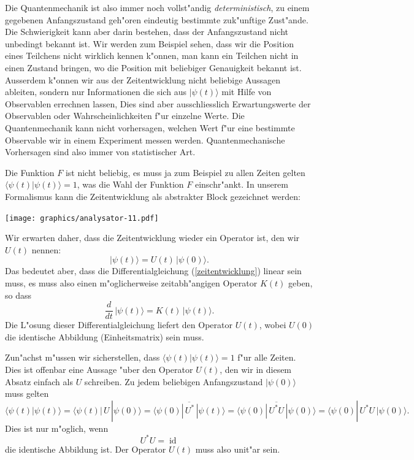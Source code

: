 Die Quantenmechanik ist also immer noch vollst"andig {\em deterministisch},
zu einem gegebenen Anfangszustand geh"oren eindeutig bestimmte
zuk"unftige Zust"ande.
Die Schwierigkeit kann aber darin bestehen, dass der Anfangszustand nicht
unbedingt bekannt ist.
Wir werden zum Beispiel sehen, dass wir die Position eines Teilchens
nicht wirklich kennen k"onnen, man kann ein Teilchen nicht in
einen Zustand bringen, wo die Position mit beliebiger Genauigkeit
bekannt ist.
Ausserdem k"onnen wir aus der Zeitentwicklung nicht beliebige Aussagen
ableiten, sondern nur Informationen die sich aus $|\psi(t)\rangle$ 
mit Hilfe von Observablen errechnen lassen,
Dies sind aber ausschliesslich Erwartungswerte der Observablen oder
Wahrscheinlichkeiten f"ur einzelne Werte.
Die Quantenmechanik kann nicht vorhersagen, welchen Wert f"ur eine
bestimmte Observable wir in einem Experiment messen werden.
Quantenmechanische Vorhersagen sind also immer von statistischer Art.


Die Funktion $F$ ist nicht beliebig, es muss ja zum Beispiel zu allen Zeiten
gelten
$\langle\psi(t)|\psi(t)\rangle=1$, was die Wahl der Funktion $F$ einschr"ankt.
In unserem Formalismus kann die Zeitentwicklung als abstrakter Block
gezeichnet werden:
\begin{center}
\texttt{[image: graphics/analysator-11.pdf]}
\end{center}
Wir erwarten daher, dass die Zeitentwicklung wieder ein Operator ist,
den wir $U(t)$ nennen:
\[
|\psi(t)\rangle = U(t)\,|\psi(0)\rangle.
\]
Das bedeutet aber, dass die Differentialgleichung (\ref{zeitentwicklung})
linear sein muss, es muss also einen m"oglicherweise zeitabh"angigen
Operator $K(t)$ geben, so dass 
\begin{equation}
\frac{d}{dt}\,|\psi(t)\rangle = K(t)\,|\psi(t)\rangle.
\label{zeitentwicklung-linear}
\end{equation}
Die L"osung dieser Differentialgleichung liefert den Operator $U(t)$,
wobei $U(0)$ die identische Abbildung (Einheitsmatrix) sein muss.

Zun"achst m"ussen wir sicherstellen, dass $\langle\psi(t)|\psi(t)\rangle=1$
f"ur alle Zeiten. Dies ist offenbar eine Aussage "uber den Operator $U(t)$,
den wir in diesem Absatz einfach als $U$ schreiben.
Zu jedem beliebigen Anfangszustand $|\psi(0)\rangle$ muss gelten
\[
\langle \psi(t)|\psi(t)\rangle
=
\langle \psi(t)|\,U\,|\psi(0)\rangle
=
\overline{\langle\psi(0)|\,U^*\,|\psi(t)\rangle}
=
\overline{\langle\psi(0)|\,U^*U\,|\psi(0)\rangle}
=
\langle\psi(0)|\,U^*U\,|\psi(0)\rangle.
\]
Dies ist nur m"oglich, wenn
\begin{equation}
U^*U=\operatorname{id}
\label{unitaritaetsbedingung}
\end{equation}
die identische Abbildung ist. Der Operator $U(t)$ muss also unit"ar sein.


